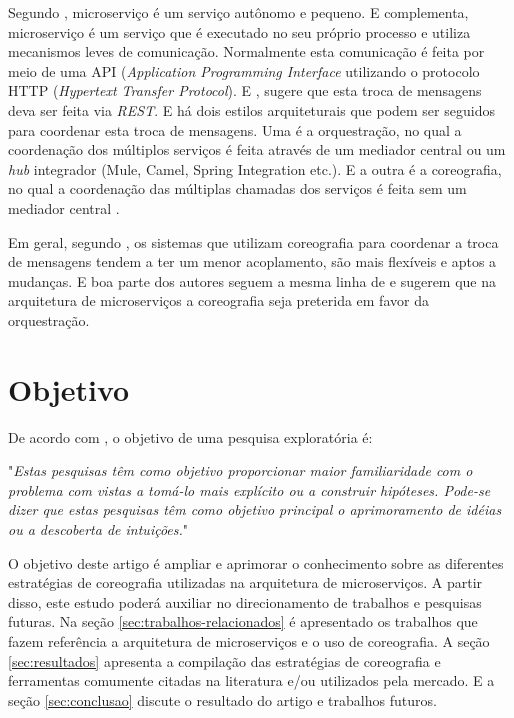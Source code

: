 \documentclass[12pt]{article}
\theoremstyle{plain}
\begin{document}
Segundo \cite{Newman:15}, microserviço é um serviço autônomo e pequeno. E \cite{martinfowler-microservices:2014} complementa, microserviço é um serviço que é executado no seu próprio processo e utiliza mecanismos leves de comunicação. Normalmente esta comunicação é feita por meio de uma API (\textit{Application Programming Interface} utilizando o protocolo HTTP (\textit{Hypertext Transfer Protocol}). E \cite{Newman:15}, sugere que esta troca de mensagens deva ser feita via \textit{REST}. E há dois estilos arquiteturais que podem ser seguidos para coordenar esta troca de mensagens. Uma é a orquestração, no qual a coordenação dos múltiplos serviços é feita através de um mediador central ou um \textit{hub} integrador (Mule, Camel, Spring Integration etc.). E a outra é a coreografia, no qual a coordenação das múltiplas chamadas dos serviços é feita sem um mediador central \cite{richards:15, Newman:15}. 

Em geral, segundo \cite{Newman:15}, os sistemas que utilizam coreografia para coordenar a troca de mensagens tendem a ter um menor acoplamento, são mais flexíveis e aptos a mudanças. E boa parte dos autores \cite{wolf:2018, Dragoni2017, richards:15, Alshuqayran:2016} seguem a mesma linha de \cite{Newman:15} e sugerem que na arquitetura de microserviços a coreografia seja preterida em favor da orquestração.

\section{Objetivo} \label{sec:firstpage}

De acordo com \cite{gil:17}, o objetivo de uma pesquisa exploratória é:

"\emph{Estas pesquisas têm como objetivo proporcionar maior familiaridade com o problema com vistas a
tomá-lo mais explícito ou a construir hipóteses. Pode-se dizer que estas pesquisas têm como
objetivo principal o aprimoramento de idéias ou a descoberta de intuições.}"

O objetivo deste artigo é ampliar e aprimorar o conhecimento sobre as diferentes estratégias de coreografia utilizadas na arquitetura de microserviços. A partir disso, este estudo poderá auxiliar no direcionamento de trabalhos e pesquisas futuras. Na seção \ref{sec:trabalhos-relacionados} é apresentado os trabalhos que fazem referência a arquitetura de microserviços e o uso de coreografia. A seção \ref{sec:resultados} apresenta a compilação das estratégias de coreografia e ferramentas comumente citadas na literatura e/ou utilizados pela mercado. E a seção \ref{sec:conclusao} discute o resultado do artigo e trabalhos futuros.
\end{document}
